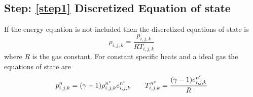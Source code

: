 \documentclass[fleqn]{article}
\begin{document}
{\subsection{Step: \ref{step1}  \textsf{Discretized Equation of state}}
%
%
If the energy equation is not included then the discretized equations of state is
\begin{equation}
    \rho_{i,j,k} = \frac{p_{i,j,k}}{R T_{i,j,k}}
\end{equation}
%
%
where $R$ is the gas constant.  For constant specific heats and a ideal gas
the equations of state are
\begin{equation}
    p^{n}_{i,j,k} = (\gamma - 1) \rhonc_{i,j,k} e^{n^{c}}_{i,j,k} \quad \quad 
    \Tnc_{i,j,k} = \frac{(\gamma - 1)e^{n^{c}}_{i,j,k}}{R}
\end{equation}
%
%
%
%
}
\end{document}
